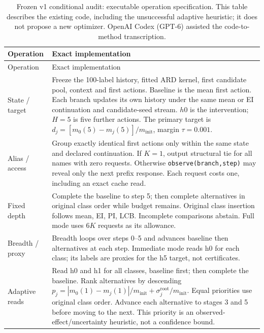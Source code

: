 \FloatBarrier\begingroup\fontsize{8.5}{10.5}\selectfont\setlength\tabcolsep{3pt}
\begin{longtable}{@{}>{\raggedright\arraybackslash}p{.17\linewidth}>{\raggedright\arraybackslash}p{}@{}}
\caption{Frozen v1 conditional audit: executable operation specification. This table describes the existing code, including the unsuccessful adaptive heuristic; it does not propose a new optimizer. OpenAI Codex (GPT-6) assisted the code-to-method transcription.}\label{tab:conditional_algorithm}\tabularnewline
\toprule
Operation & Exact implementation \\
\midrule
\endfirsthead
\toprule
Operation & Exact implementation \\
\midrule
\endhead
\bottomrule
\endlastfoot
State / target & Freeze the 100-label history, fitted ARD kernel, first candidate pool, context and first actions. Baseline is the mean first action. Each branch updates its own history under the same mean or EI continuation and candidate-seed stream. $h0$ is the intervention; $H=5$ is five further actions. The primary target is $d_j=[m_0(5)-m_j(5)]/m_{\mathrm{init}}$, margin $\tau=0.001$. \\
Alias / access & Group exactly identical first actions only within the same state and declared continuation. If $K=1$, output structural tie for all names with zero requests. Otherwise \texttt{observe(branch,step)} may reveal only the next prefix response. Each request costs one, including an exact cache read. \\
Fixed depth & Complete the baseline to step 5; then complete alternatives in original class order while budget remains. Original class insertion follows mean, EI, PI, LCB. Incomplete comparisons abstain. Full mode uses $6K$ requests as its allowance. \\
Breadth / proxy & Breadth loops over steps 0--5 and advances baseline then alternatives at each step. Immediate mode reads h0 for each class; its labels are proxies for the h5 target, not certificates. \\
Adaptive reads & Read h0 and h1 for all classes, baseline first; then complete the baseline. Rank alternatives by descending $p_j=|m_0(1)-m_j(1)|/m_{\mathrm{init}}+\sigma_j^{\mathrm{root}}/m_{\mathrm{init}}$. Equal priorities use original class order. Advance each alternative to stages 3 and 5 before moving to the next. This priority is an observed-effect/uncertainty heuristic, not a confidence bound. \\

\end{longtable}
